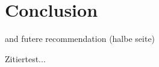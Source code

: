 \documentclass[5p,times,procedia]{elsarticle}
\newenvironment{note}{%
	\noindent
    \color{notecolor}%
}{%
    \par\medskip%
}
\begin{document}
\section{Conclusion}
\begin{note}
	and futere recommendation (halbe seite)
	
\end{note}






Zitiertest...

\cite{Al-Naggar.Jamil.ea2021,Axinte.Gindy2004a,Ma.Howard.ea2020}

\cite{Axinte.Gindy2004a}

\cite{Ma.Howard.ea2020}

\cite{Biermann.Zabel.ea2013}

\cite{Chen.Lin2017}

\end{document}
